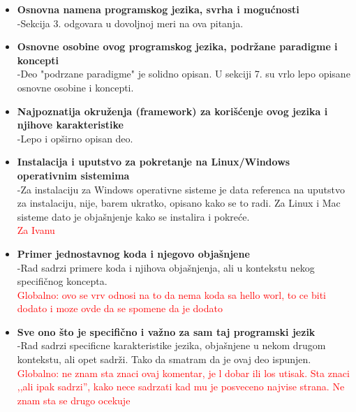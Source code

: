 \documentclass[a4paper]{report}
\newcommand{\note}[1]{\textcolor{red}{#1}}
\begin{document}
\begin{enumerate}
\begin{itemize}
    \item \textbf {Osnovna namena programskog jezika, svrha i mogućnosti}\\
      -Sekcija 3. odgovara u dovoljnoj meri na ova pitanja.
    \item \textbf {Osnovne osobine ovog programskog jezika, podržane paradigme i koncepti}\\
      -Deo "podrzane paradigme" je solidno opisan. U sekciji 7. su vrlo lepo opisane osnovne osobine i koncepti.
    \item \textbf {Najpoznatija okruženja (framework) za korišćenje ovog jezika i njihove karakteristike}\\
      -Lepo i op\v sirno opisan deo.
    \item \textbf {Instalacija i uputstvo za pokretanje na Linux/Windows operativnim sistemima} \\
       -Za instalaciju za Windows operativne sisteme je data referenca na uputstvo za instalaciju, nije, barem ukratko, opisano kako se to radi. Za Linux i Mac sisteme dato je obja\v snjenje kako se instalira i pokre\' ce. \\
\note{Za Ivanu}
    \item \textbf {Primer jednostavnog koda i njegovo objašnjene}\\
      -Rad sadrzi primere koda i njihova obja\v snjenja, ali u kontekstu nekog specifi\v cnog koncepta. \\
\note{Globalno: ovo se vrv odnosi na to da nema koda sa hello worl, to ce biti dodato i moze ovde da se spomene da je dodato}
    \item \textbf {Sve ono što je specifično i važno za sam taj programski jezik} \\
      -Rad sadrzi specificne karakteristike jezika, obja\v snjene u nekom drugom kontekstu, ali opet sadr\v zi. Tako da smatram da je ovaj deo ispunjen.
\note{Globalno: ne znam sta znaci ovaj komentar, je l dobar ili los utisak. Sta znaci ,,ali ipak sadrzi'', kako nece sadrzati kad mu je posveceno najvise strana. Ne znam sta se drugo ocekuje}
\end{itemize}


\end{enumerate}
\end{document}
